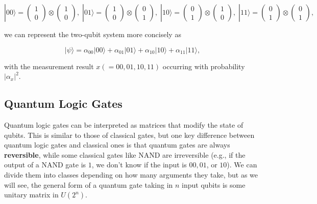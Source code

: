 \documentclass{article}
\theoremstyle{definition}
\begin{document}
    \[
      |00\rangle = \begin{pmatrix} 1 \\ 0 \end{pmatrix} \otimes \begin{pmatrix} 1 \\ 0 \end{pmatrix}, \; 
      |01\rangle = \begin{pmatrix} 1 \\ 0 \end{pmatrix} \otimes \begin{pmatrix} 0 \\ 1 \end{pmatrix}, \; 
      |10\rangle = \begin{pmatrix} 0 \\ 1 \end{pmatrix} \otimes \begin{pmatrix} 1 \\ 0 \end{pmatrix}, \; 
      |11\rangle = \begin{pmatrix} 0 \\ 1 \end{pmatrix} \otimes \begin{pmatrix} 0 \\ 1 \end{pmatrix}, 
    \]

    we can represent the two-qubit system more concisely as

      \[|\psi \rangle = \alpha_{00} |00\rangle + \alpha_{01} |01\rangle + \alpha_{10} |10\rangle + \alpha_{11} |11\rangle,\]

    with the measurement result $x ( = 00, 01, 10, 11)$ occurring with probability $|\alpha_{x}|^2$.

  \subsection{Quantum Logic Gates}

    Quantum logic gates can be interpreted as matrices that modify the state of qubits. This is similar to those of classical gates, but one key difference between quantum logic gates and classical ones is that quantum gates are always \textbf{reversible}, while some classical gates like NAND are irreversible (e.g., if the output of a NAND gate is $1$, we don't know if the input is $00, 01$, or $10$). We can divide them into classes depending on how many arguments they take, but as we will see, the general form of a quantum gate taking in $n$ input qubits is some unitary matrix in $U(2^n)$.
\end{document}
